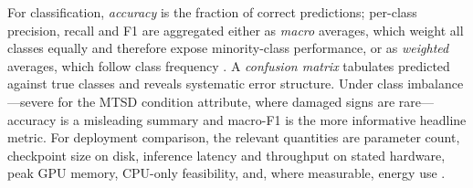 For classification, \emph{accuracy} is the fraction of correct predictions; per-class precision, recall and F1 are aggregated either as \emph{macro} averages, which weight all classes equally and therefore expose minority-class performance, or as \emph{weighted} averages, which follow class frequency \citep{sokolova2009systematic}. A \emph{confusion matrix} tabulates predicted against true classes and reveals systematic error structure. Under class imbalance---severe for the MTSD condition attribute, where damaged signs are rare---accuracy is a misleading summary and macro-F1 is the more informative headline metric. For deployment comparison, the relevant quantities are parameter count, checkpoint size on disk, inference latency and throughput on stated hardware, peak GPU memory, CPU-only feasibility, and, where measurable, energy use \citep{murshed2021machine}.
